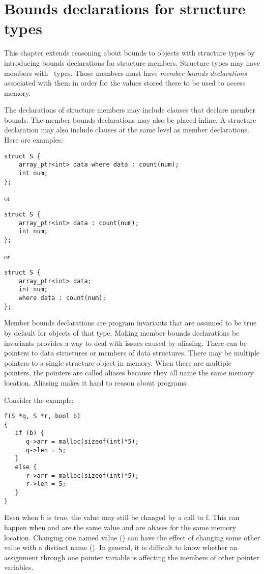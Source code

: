 
\chapter{Bounds declarations for structure types}
\label{chapter:structure-bounds}

This chapter extends reasoning about bounds to objects with structure
types by introducing bounds declarations for structure members.
Structure types may have members with \arrayptr\ types. Those
members must have \emph{member bounds declarations} associated with them in order for
the values stored there to be used to access memory.

The declarations of
structure members may include  clauses that declare member
bounds. The member bounds declarations may also be placed inline.
A structure declaration may also include  clauses at the same
level as member declarations.  Here are examples:

\begin{lstlisting}
struct S {
    array_ptr<int> data where data : count(num);
    int num;
};
\end{lstlisting}
or
\begin{lstlisting}
struct S {
    array_ptr<int> data : count(num);
    int num;
};
\end{lstlisting}
or
\begin{lstlisting}
struct S {
    array_ptr<int> data;
    int num;
    where data : count(num);
};
\end{lstlisting}

Member bounds declarations are program invariants that are assumed to be true
by default for objects of that type.
Making member bounds declarations be invariants provides a way to deal with issues
caused by aliasing. There can be pointers to data structures or members
of data structures. There may be multiple pointers to a single
structure object in memory. When there are multiple pointers,
the pointers are called aliases because they all name the same
memory location.  Aliasing makes it hard to reason about programs.

Consider the example:
\begin{lstlisting}
f(S *q, S *r, bool b)
{
   if (b) {
      q->arr = malloc(sizeof(int)*5);
      q->len = 5;
   }
   else {
      r->arr = malloc(sizeof(int)*5);
      r->len = 5;
   }
}
\end{lstlisting}

Even when b is true, the value  may still be
changed by a call to f. This can happen when  and 
are the same value and are aliases for the same memory location.
Changing one named value () can have the
effect of changing some other value with a distinct name
(). In general, it is difficult to know
whether an assignment through one pointer variable is affecting the
members of other pointer variables.

